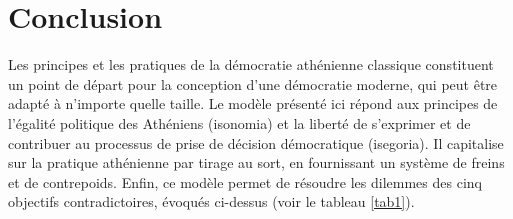 
\section{Conclusion}
Les principes et les pratiques de la démocratie athénienne classique
constituent un point de départ pour la conception d'une démocratie
moderne, qui peut être adapté à n'importe quelle taille. Le modèle
présenté ici répond aux principes de l'égalité politique des Athéniens
(isonomia) et la liberté de s'exprimer et de contribuer au processus
de prise de décision démocratique (isegoria). Il capitalise sur la
pratique athénienne par tirage au sort, en fournissant un système de
freins et de contrepoids. Enfin, ce modèle permet de résoudre les
dilemmes des cinq objectifs contradictoires, évoqués ci-dessus (voir le
tableau \ref{tab1}).

